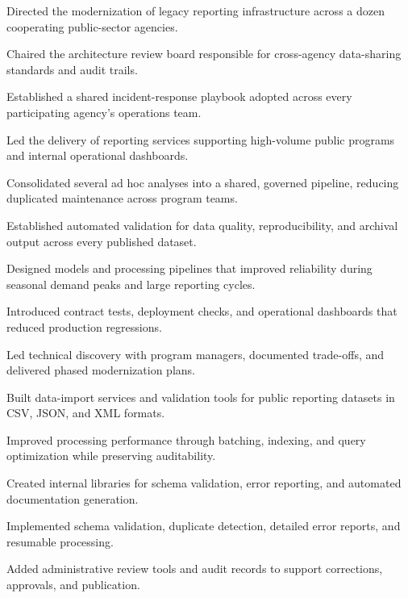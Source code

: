 \documentclass[fontsize=11pt, margin=narrow, medium=print]{careerdossier-resume}
\begin{document}
\MakeCDossierHeader

\begin{CDossierEntry}[title = {Modernization Program}, organization = {Continental Reliability Consortium}, location = {Ottawa, ON}, dates = {2019--Present}]
  \begin{CDossierItemize}
    \item Directed the modernization of legacy reporting infrastructure across a dozen cooperating public-sector agencies.
    \item Chaired the architecture review board responsible for cross-agency data-sharing standards and audit trails.
    \item Established a shared incident-response playbook adopted across every participating agency's operations team.
    \item Led the delivery of reporting services supporting high-volume public programs and internal operational dashboards.
    \item Consolidated several ad hoc analyses into a shared, governed pipeline, reducing duplicated maintenance across program teams.
    \item Established automated validation for data quality, reproducibility, and archival output across every published dataset.
    \item Designed models and processing pipelines that improved reliability during seasonal demand peaks and large reporting cycles.
    \item Introduced contract tests, deployment checks, and operational dashboards that reduced production regressions.
    \item Led technical discovery with program managers, documented trade-offs, and delivered phased modernization plans.
    \item Built data-import services and validation tools for public reporting datasets in CSV, JSON, and XML formats.
    \item Improved processing performance through batching, indexing, and query optimization while preserving auditability.
    \item Created internal libraries for schema validation, error reporting, and automated documentation generation.
    \item Implemented schema validation, duplicate detection, detailed error reports, and resumable processing.
    \item Added administrative review tools and audit records to support corrections, approvals, and publication.

\end{CDossierItemize}
\end{CDossierEntry}
\end{document}
